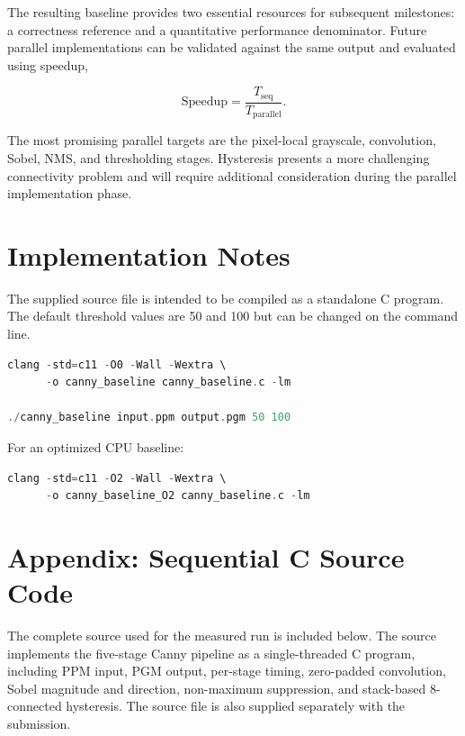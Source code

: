 \documentclass[conference]{IEEEtran}
\begin{document}
The resulting baseline provides two essential resources for subsequent
milestones: a correctness reference and a quantitative performance
denominator. Future parallel implementations can be validated against the
same output and evaluated using speedup,

\begin{equation}
\mathrm{Speedup}
=
\frac{T_{\mathrm{seq}}}{T_{\mathrm{parallel}}}.
\end{equation}

The most promising parallel targets are the pixel-local grayscale,
convolution, Sobel, NMS, and thresholding stages. Hysteresis presents a more
challenging connectivity problem and will require additional consideration
during the parallel implementation phase.

\section*{Implementation Notes}

The supplied source file is intended to be compiled as a standalone C
program. The default threshold values are 50 and 100 but can be changed on
the command line.

\begin{lstlisting}[language=C]
clang -std=c11 -O0 -Wall -Wextra \
      -o canny_baseline canny_baseline.c -lm

./canny_baseline input.ppm output.pgm 50 100
\end{lstlisting}

For an optimized CPU baseline:

\begin{lstlisting}[language=C]
clang -std=c11 -O2 -Wall -Wextra \
      -o canny_baseline_O2 canny_baseline.c -lm
\end{lstlisting}


\section*{Appendix: Sequential C Source Code}

The complete source used for the measured run is included below. The source
implements the five-stage Canny pipeline as a single-threaded C program,
including PPM input, PGM output, per-stage timing, zero-padded convolution,
Sobel magnitude and direction, non-maximum suppression, and stack-based
8-connected hysteresis. The source file is also supplied separately with
the submission.


\end{document}
